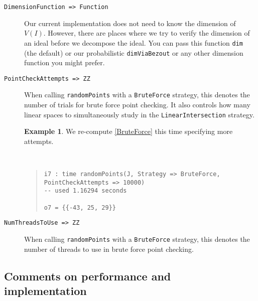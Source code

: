 \documentclass[11pt]{amsart}
\theoremstyle{definition}
\newtheorem{example}{Example}[section]
\begin{document}
\begin{description}
    \item[\tt DimensionFunction => Function]
        Our current implementation does not need to know the dimension of $V(I)$.  However, there are places where we try to verify the dimension of an ideal before we decompose the ideal.  You can pass this function {\tt dim} (the default) or our probabilistic {\tt dimViaBezout} or any other dimension function you might prefer.

    \item[\tt PointCheckAttempts => ZZ]

    When calling {\tt randomPoints} with a {\tt BruteForce} strategy, this denotes the number of trials for brute force point checking.  It also controls how many linear spaces to simultaneously study in the {\tt LinearIntersection} strategy.
    
    \begin{example}
        We re-compute \cref{BruteForce} this time specifying more attempts.
    {{\small\color{blue}
    ~~
    \begin{quote}
\begin{verbatim}    
i7 : time randomPoints(J, Strategy => BruteForce, PointCheckAttempts => 10000)
-- used 1.16294 seconds

o7 = {{-43, 25, 29}}
    \end{verbatim}%
\end{quote}\vspace{-1em}%
}}%
    \end{example}%
    
    \item[\tt NumThreadsToUse => ZZ]

    When calling {\tt randomPoints} with a {\tt BruteForce} strategy, this denotes the number of threads to use in brute force point checking.
    \end{description}

    \subsection{Comments on performance and implementation}
    \label{subsec.CommentOnPerformanceAndImplementation}
\end{document}
